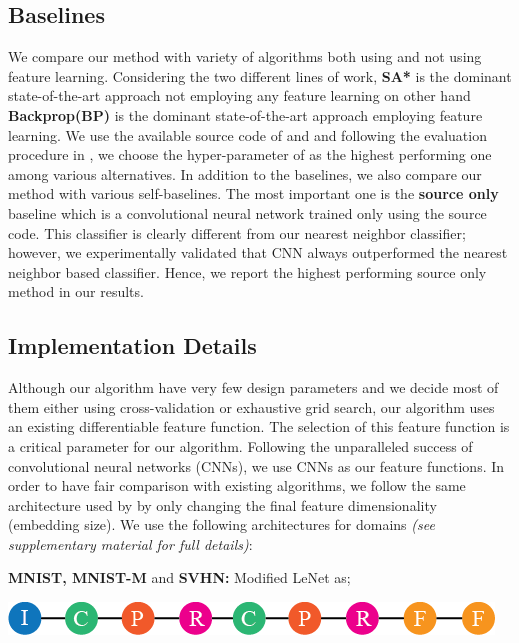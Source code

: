 \subsection{Baselines}
We compare our method with variety of algorithms both using and not using feature learning. Considering the two different lines of work, \textbf{SA*}\cite{fernando13} is the dominant state-of-the-art approach not employing any feature learning on other hand \textbf{Backprop(BP)}\cite{ganin15} is the dominant state-of-the-art approach employing feature learning. We use the available source code of \cite{ganin15} and \cite{fernando13} and following the evaluation procedure in \cite{ganin15}, we choose the hyper-parameter of \cite{fernando13} as the highest performing one among various alternatives. In addition to the baselines, we also compare our method with various self-baselines. The most important one is the \textbf{source only} baseline which is a convolutional neural network trained only using the source code. This classifier is clearly different from our nearest neighbor classifier; however, we experimentally validated that CNN always outperformed the nearest neighbor based classifier. Hence, we report the highest performing source only method in our results.

\subsection{Implementation Details}
\label{imp_det}
Although our algorithm have very few design parameters and we decide most of them either using cross-validation or exhaustive grid search, our algorithm uses an existing differentiable feature function. The selection of this feature function is a critical parameter for our algorithm. Following the unparalleled success of convolutional neural networks (CNNs), we use CNNs as our feature functions.  In order to have  fair comparison with existing algorithms, we follow the same architecture used by \cite{ganin15} by only changing the final feature dimensionality (embedding size). We use the following architectures for domains \emph{(see supplementary material for full details)}:

\noindent \textbf{MNIST, MNIST-M} and \textbf{SVHN:} Modified LeNet\cite{lenet} as;

\includegraphics[width=\columnwidth]{lenet}


